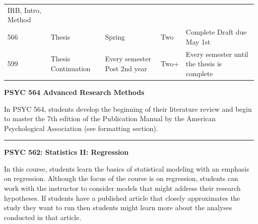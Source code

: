 \documentclass[openany]{book}
\begin{document}
\begin{longtable}[]{@{}lllll@{}}
\begin{minipage}[t]{0.19\columnwidth}
IRB, Intro, Method\strut
\end{minipage}\tabularnewline
\begin{minipage}[t]{0.03\columnwidth}\raggedright
566\strut
\end{minipage} & \begin{minipage}[t]{0.27\columnwidth}\raggedright
Thesis\strut
\end{minipage} & \begin{minipage}[t]{0.26\columnwidth}\raggedright
Spring\strut
\end{minipage} & \begin{minipage}[t]{0.10\columnwidth}\raggedright
Two\strut
\end{minipage} & \begin{minipage}[t]{0.19\columnwidth}\raggedright
Complete Draft due May 1st\strut
\end{minipage}\tabularnewline
\begin{minipage}[t]{0.03\columnwidth}\raggedright
599\strut
\end{minipage} & \begin{minipage}[t]{0.27\columnwidth}\raggedright
Thesis Continuation\strut
\end{minipage} & \begin{minipage}[t]{0.26\columnwidth}\raggedright
Every semester Post 2nd year\strut
\end{minipage} & \begin{minipage}[t]{0.10\columnwidth}\raggedright
Two+\strut
\end{minipage} & \begin{minipage}[t]{0.19\columnwidth}\raggedright
Every semester until the thesis is complete\strut
\end{minipage}\tabularnewline
\bottomrule
\end{longtable}

\textbf{PSYC 564 Advanced Research Methods}

In PSYC 564, students develop the beginning of their literature review and begin to master the 7th edition of the Publication Manual by the American Psychological Association (see formatting section).

\begin{center}\rule{0.5\linewidth}{0.5pt}\end{center}

\textbf{PSYC 562: Statistics II: Regression}

In this course, students learn the basics of statistical modeling with an emphasis on regression. Although the focus of the course is on regression, students can work with the instructor to consider models that might address their research hypotheses. If students have a published article that closely approximates the study they want to run then students might learn more about the analyses conducted in that article.
\end{document}
